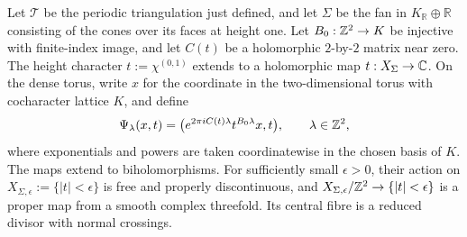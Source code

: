 \begin{lemma}\label{lem:an-finite-index-cusp}
Let $\mathcal T$ be the periodic triangulation just defined, and let
$\Sigma$ be the fan in
$K_{\mathbb R}\oplus\mathbb R$ consisting of the cones over its faces
at height one.  Let $B_0:\mathbb Z^2\to K$ be injective with finite-index
image, and let $C(t)$ be a holomorphic $2$-by-$2$ matrix near zero.
The height character $t:=\chi^{(0,1)}$ extends to a holomorphic map
$t:X_\Sigma\to\mathbb C$.  On the dense torus, write $x$ for the coordinate
in the two-dimensional torus with cocharacter lattice $K$, and define
\begin{equation}\label{eq:an-toric-action}
 \Psi_\lambda(x,t)
 =\bigl(e^{2\pi iC(t)\lambda}t^{B_0\lambda}x,t\bigr),
 \qquad \lambda\in\mathbb Z^2,
\end{equation}
where exponentials and powers are taken coordinatewise in the chosen basis
of $K$.  The maps extend to biholomorphisms.  For sufficiently
small $\epsilon>0$, their action on
$X_{\Sigma,\epsilon}:=\{|t|<\epsilon\}$ is free and properly
discontinuous, and
$X_{\Sigma,\epsilon}/\mathbb Z^2\to\{|t|<\epsilon\}$ is a proper map from a
smooth complex threefold.  Its central fibre is a reduced divisor with
normal crossings.
\end{lemma}

